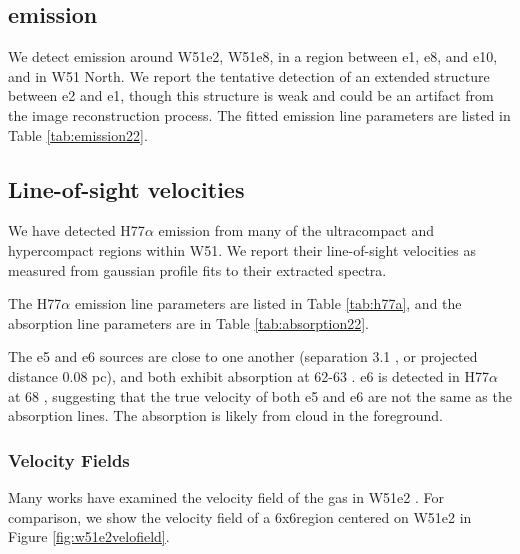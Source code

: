 
\subsection{\formaldehyde \twotwo emission}
\label{sec:twotwoemission}
We detect \formaldehyde \twotwo emission around W51e2, W51e8, in a region
between e1, e8, and e10, and in W51 North.  We report the tentative detection
of an extended structure between e2 and e1, though this structure is weak
and could be an artifact from the image reconstruction process.
The fitted emission line parameters are listed in Table \ref{tab:emission22}.



\subsection{Line-of-sight velocities}
\label{sec:LOSvelo}
We have detected H77$\alpha$ emission from many of the ultracompact and
hypercompact \hii regions within W51.  We report their line-of-sight velocities
as measured from gaussian profile fits to their extracted spectra.

The H77$\alpha$ emission line parameters are listed in Table \ref{tab:h77a}, and
the \para \twotwo absorption line parameters are in Table \ref{tab:absorption22}.

The e5 and e6 sources are close to one another (separation 3.1 \arcsec, or
projected distance 0.08 pc), and both exhibit \formaldehyde absorption at 62-63
\kms.  e6 is detected in H77$\alpha$ at 68 \kms, suggesting that the true
velocity of both e5 and e6 are not the same as the \formaldehyde absorption
lines.  The \formaldehyde absorption is likely from cloud in the foreground.





\subsubsection{Velocity Fields}
Many works have examined the velocity field of the gas in W51e2
\citep{Zhang1997a,Keto2008b,Shi2010b,Shi2010a,Goddi2015b}.  For comparison, we show the
velocity field of a 6x6\arcsec region centered on W51e2 in Figure
\ref{fig:w51e2velofield}.

